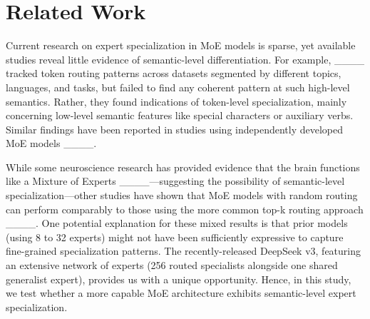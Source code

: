 \section{Related Work}
Current research on expert specialization in MoE models is sparse, yet available studies reveal little evidence of semantic-level differentiation. For example, ____ tracked token routing patterns across datasets segmented by different topics, languages, and tasks, but failed to find any coherent pattern at such high-level semantics. Rather, they found indications of token-level specialization, mainly concerning low-level semantic features like special characters or auxiliary verbs. Similar findings have been reported in studies using independently developed MoE models ____.

While some neuroscience research has provided evidence that the brain functions like a Mixture of Experts ____---suggesting the possibility of semantic-level specialization---other studies have shown that MoE models with random routing can perform comparably to those using the more common top-k routing approach ____. One potential explanation for these mixed results is that prior models (using 8 to 32 experts) might not have been sufficiently expressive to capture fine-grained specialization patterns. The recently-released DeepSeek v3, featuring an extensive network of experts (256 routed specialists alongside one shared generalist expert), provides us with a unique opportunity. Hence, in this study, we test whether a more capable MoE architecture exhibits semantic-level expert specialization.